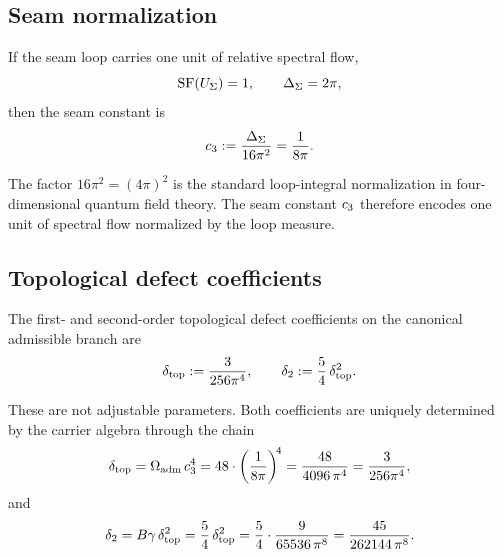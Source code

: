 \subsection{Seam normalization}\label{sec:seam-norm}

\begin{proposition}
\label{prop:seam-normalization}
If the seam loop carries one unit of relative spectral flow,
\begin{equation}\label{eq:seam-flow}
\operatorname{SF}(U_{\Sigma})=1,
\qquad
\Delta_{\Sigma}=2\pi,
\end{equation}
then the seam constant is
\begin{equation}\label{eq:c3}
c_3:=\frac{\Delta_\Sigma}{16\pi^2}=\frac{1}{8\pi}.
\end{equation}
\end{proposition}

\begin{remark}
The factor $16\pi^2=(4\pi)^2$ is the standard loop-integral
normalization in four-dimensional quantum field theory. The seam
constant $c_3$ therefore encodes one unit of spectral flow
normalized by the loop measure.
\end{remark}

\subsection{Topological defect coefficients}\label{sec:defect-coefficients}

\begin{definition}
\label{def:hard-topological-kernel}
The first- and second-order topological defect coefficients on the canonical
admissible branch are
\begin{equation}\label{eq:defects}
\delta_{\mathrm{top}}:=\frac{3}{256\pi^4},
\qquad
\delta_2:=\frac54\,\delta_{\mathrm{top}}^2.
\end{equation}
\end{definition}

These are not adjustable parameters. Both coefficients are uniquely
determined by the carrier algebra through the chain
\begin{equation}\label{eq:defect-chain}
\delta_{\mathrm{top}}
=
\Omega_{\mathrm{adm}}\,c_3^4
=
48\cdot\left(\frac{1}{8\pi}\right)^{\!4}
=
\frac{48}{4096\,\pi^4}
=
\frac{3}{256\pi^4},
\end{equation}
and
\begin{equation}\label{eq:delta2-derivation}
\delta_2
=
B\gamma\,\delta_{\mathrm{top}}^2
=
\frac54\,\delta_{\mathrm{top}}^2
=
\frac{5}{4}\cdot\frac{9}{65536\,\pi^8}
=
\frac{45}{262144\,\pi^8}.
\end{equation}

